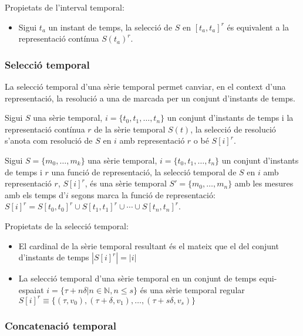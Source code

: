 Propietats de l'interval temporal:

\begin{itemize}
\item Sigui $t_a$ un instant de temps, la selecció de
  $S$ en $[t_a,t_a]^r$ és equivalent a la representació contínua
  $S(t_a)^r$.
\end{itemize}




\subsubsection{Selecció temporal}


La selecció  temporal d'una sèrie temporal permet canviar, en el
context d'una representació, la resolució a una de marcada per un
conjunt d'instants de temps. 

Sigui $S$ una sèrie temporal, $i= \{t_0,t_1,\dotsc,t_n\}$ un conjunt
d'instants de temps i la representació contínua $r$ de la sèrie
temporal $S(t)$, la selecció de resolució s'anota com resolució de $S$
en $i$ amb representació $r$ o bé $S[i]^r$.


\begin{definition}
  Sigui $S=\{m_0, \ldots, m_k\}$ una sèrie temporal,
  $i=\{t_0,t_1,\dotsc,t_n\}$ un conjunt d'instants de temps i $r$ una
  funció de representació, la selecció temporal de $S$ en $i$ amb
  representació $r$, $S[i]^r$, és una sèrie temporal $S'=\{m_0, \ldots, m_n\}$
  amb les mesures amb els temps d'$i$ segons marca la funció de
  representació: $S[i]^r= S[t_0,t_0]^r \cup S[t_1,t_1]^r \cup \dotsb
  \cup S[t_n,t_n]^r$.
\end{definition}

Propietats de la selecció temporal:
\begin{itemize}

\item El cardinal de la sèrie temporal resultant és el mateix que el
  del conjunt d'instants de temps $|S[i]^r| = |i|$

\item La selecció temporal d'una sèrie temporal en un conjunt de temps
  equi-espaiat $i = \{\tau+n\delta | n\in\mathbb{N}, n\leq s \}$ és una
  sèrie temporal regular $S[i]^r \equiv \{ (\tau, v_0),
  (\tau+\delta,v_1), \dotsc , (\tau+s\delta,v_s)\}$
\end{itemize}




\subsubsection{Concatenació temporal}

